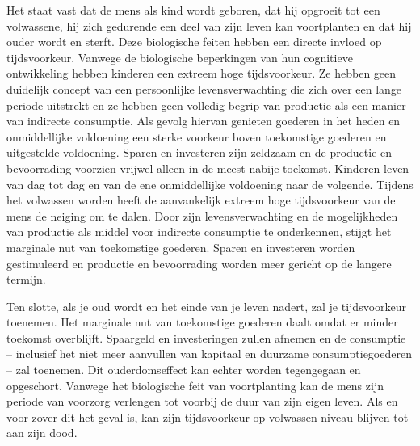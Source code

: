 \begin{blockquotebox}
    Het staat vast dat de mens als kind wordt geboren, dat hij opgroeit tot een volwassene, hij zich gedurende een deel van zijn leven kan voortplanten en dat hij ouder wordt en sterft. Deze biologische feiten hebben een directe invloed op tijdsvoorkeur. Vanwege de biologische beperkingen van hun cognitieve ontwikkeling hebben kinderen een extreem hoge tijdsvoorkeur. Ze hebben geen duidelijk concept van een persoonlijke levensverwachting die zich over een lange periode uitstrekt en ze hebben geen volledig begrip van productie als een manier van indirecte consumptie. Als gevolg hiervan genieten goederen in het heden en onmiddellijke voldoening een sterke voorkeur boven toekomstige goederen en uitgestelde voldoening. Sparen en investeren zijn zeldzaam en de productie en bevoorrading voorzien vrijwel alleen in de meest nabije toekomst. Kinderen leven van dag tot dag en van de ene onmiddellijke voldoening naar de volgende. Tijdens het volwassen worden heeft de aanvankelijk extreem hoge tijdsvoorkeur van de mens de neiging om te dalen. Door zijn levensverwachting en de mogelijkheden van productie als middel voor indirecte consumptie te onderkennen, stijgt het marginale nut van toekomstige goederen. Sparen en investeren worden gestimuleerd en productie en bevoorrading worden meer gericht op de langere termijn.
    \par\vspace{1em}\noindent
    Ten slotte, als je oud wordt en het einde van je leven nadert, zal je tijdsvoorkeur toenemen. Het marginale nut van toekomstige goederen daalt omdat er minder toekomst overblijft. Spaargeld en investeringen zullen afnemen en de consumptie -- inclusief het niet meer aanvullen van kapitaal en duurzame consumptiegoederen -- zal toenemen. Dit ouderdomseffect kan echter worden tegengegaan en opgeschort. Vanwege het biologische feit van voortplanting kan de mens zijn periode van voorzorg verlengen tot voorbij de duur van zijn eigen leven. Als en voor zover dit het geval is, kan zijn tijdsvoorkeur op volwassen niveau blijven tot aan zijn dood.\footnotemark
\end{blockquotebox}
\autocite{147}

